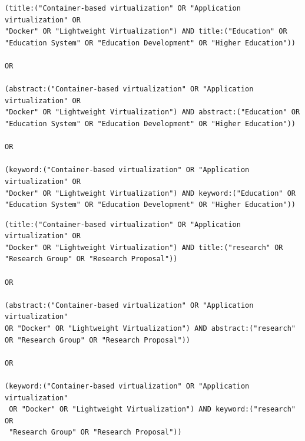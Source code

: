 \begin{tcolorbox}[
		colback=gray!5,
		colframe=black!60,
		title=Cadena de búsqueda en Springer para educación,
		fonttitle=\bfseries,
		sharp corners=south
	]
	\scriptsize %
	\begin{verbatim}
(title:("Container-based virtualization" OR "Application virtualization" OR 
"Docker" OR "Lightweight Virtualization") AND title:("Education" OR 
"Education System" OR "Education Development" OR "Higher Education"))

OR

(abstract:("Container-based virtualization" OR "Application virtualization" OR 
"Docker" OR "Lightweight Virtualization") AND abstract:("Education" OR 
"Education System" OR "Education Development" OR "Higher Education"))

OR 

(keyword:("Container-based virtualization" OR "Application virtualization" OR 
"Docker" OR "Lightweight Virtualization") AND keyword:("Education" OR 
"Education System" OR "Education Development" OR "Higher Education"))

\end{verbatim}
\end{tcolorbox}

\begin{tcolorbox}[
		colback=gray!5,
		colframe=black!60,
		title=Cadena de búsqueda en Springer para investigación,
		fonttitle=\bfseries,
		sharp corners=south
	]
	\scriptsize %
	\begin{verbatim}
(title:("Container-based virtualization" OR "Application virtualization" OR 
"Docker" OR "Lightweight Virtualization") AND title:("research" OR 
"Research Group" OR "Research Proposal"))

OR

(abstract:("Container-based virtualization" OR "Application virtualization" 
OR "Docker" OR "Lightweight Virtualization") AND abstract:("research" 
OR "Research Group" OR "Research Proposal"))

OR 

(keyword:("Container-based virtualization" OR "Application virtualization"
 OR "Docker" OR "Lightweight Virtualization") AND keyword:("research" OR 
 "Research Group" OR "Research Proposal"))

\end{verbatim}
\end{tcolorbox}

